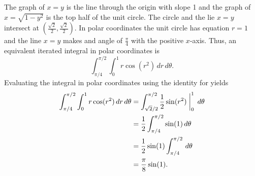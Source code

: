 \begin{exercises}
\begin{exerciseSolution}
	\item The graph of $x=y$ is the line through the origin with slope 1 and the graph of $x = \sqrt{1-y^2}$ is the top half of the unit circle. The circle and the lie $x=y$ intersect at $\left(\frac{\sqrt{2}}{2}, \frac{\sqrt{2}}{2}\right)$. In polar coordinates the unit circle has equation $r=1$ and the line $x=y$ makes and angle of $\frac{\pi}{4}$ with the positive $x$-axis. Thus, an equivalent iterated integral in polar coordinates is 
\[\int_{\pi/4}^{\pi/2} \int_{0}^{1} r \cos(r^2) \, dr \, d\theta.\]
Evaluating the integral in polar coordinates using the identity for yields
\begin{align*}
\int_{\pi/4}^{\pi/2} \int_{0}^{1} r \cos(r^2) \, dr \, d\theta &= \int_{\sqrt{2}/2}^{\pi/2} \frac{1}{2} \sin(r^2) \biggm|_{0}^{1} \, d\theta \\
	&= \frac{1}{2}\int_{\pi/4}^{\pi/2} \sin(1)  \, d\theta \\
	&= \frac{1}{2} \sin(1) \int_{\pi/4}^{\pi/2} \, d\theta \\
	&= \frac{\pi}{8} \sin(1).  
\end{align*}

\ea
\end{exerciseSolution}



\end{exercises}

\afterexercises
